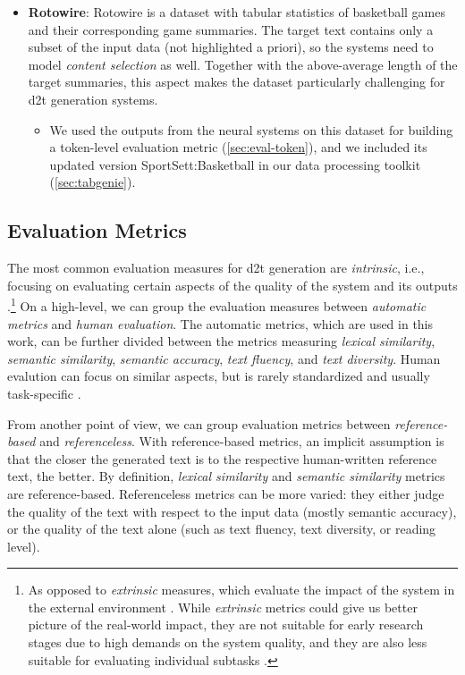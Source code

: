 \begin{itemize}
    \item \textbf{Rotowire}: Rotowire \cite{wiseman2017challenges} is a dataset with tabular statistics of basketball games and their corresponding game summaries. The target text contains only a subset of the input data (not highlighted a priori), so the systems need to model \emph{content selection} as well. Together with the above-average length of the target summaries, this aspect makes the dataset particularly challenging for \ac{d2t} generation systems.
          \begin{itemize}
              \item
                    We used the outputs from the neural systems on this dataset for building a token-level evaluation metric (\autoref{sec:eval-token}), and we included its updated version SportSett:Basketball \cite{thomson2020sportsett} in our data processing toolkit (\autoref{sec:tabgenie}).
          \end{itemize}
\end{itemize}



\subsection{Evaluation Metrics}
\label{sec:evaluation}

The most common evaluation measures for \ac{d2t} generation are \emph{intrinsic}, i.e., focusing on evaluating certain aspects of the quality of the system and its outputs \cite{gkatzia2015snapshot,celikyilmazEvaluationTextGeneration2021}.\footnote{As opposed to \emph{extrinsic} measures, which evaluate the impact of the system in the external environment \cite{celikyilmazEvaluationTextGeneration2021}. While \emph{extrinsic} metrics could give us better picture of the real-world impact, they are not suitable for early research stages due to high demands on the system quality, and they are also less suitable for evaluating individual subtasks \cite{van2019best}.} On a high-level, we can group the evaluation measures between \emph{automatic metrics} and \emph{human evaluation}. The automatic metrics, which are used in this work, can be further divided between the metrics measuring \emph{lexical similarity}, \emph{semantic similarity}, \emph{semantic accuracy}, \emph{text fluency}, and \emph{text diversity}. Human evalution can focus on similar aspects, but is rarely standardized and usually task-specific \cite{belzDisentanglingPropertiesHuman2020}.

From another point of view, we can group evaluation metrics between \emph{reference-based} and \emph{referenceless}. With reference-based metrics, an implicit assumption is that the closer the generated text is to the respective human-written reference text, the better. By definition, \emph{lexical similarity} and \emph{semantic similarity} metrics are reference-based. Referenceless metrics can be more varied: they either judge the quality of the text with respect to the input data (mostly semantic accuracy), or the quality of the text alone (such as text fluency, text diversity, or reading level).

